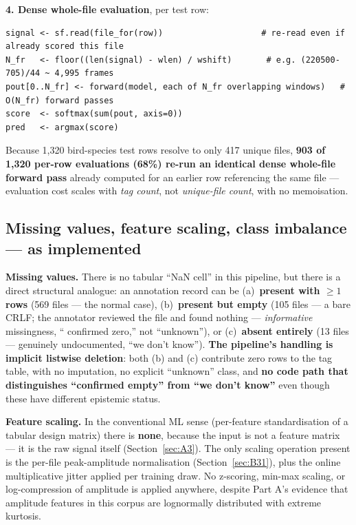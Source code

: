 \documentclass[11pt]{article}
\begin{document}
\textbf{4. Dense whole-file evaluation}, per test row:
\begin{lstlisting}
signal <- sf.read(file_for(row))                    # re-read even if already scored this file
N_fr   <- floor((len(signal) - wlen) / wshift)       # e.g. (220500-705)/44 ~ 4,995 frames
pout[0..N_fr] <- forward(model, each of N_fr overlapping windows)   # O(N_fr) forward passes
score  <- softmax(sum(pout, axis=0))
pred   <- argmax(score)
\end{lstlisting}
Because 1,320 bird-species test rows resolve to only 417 unique files,
\textbf{903 of 1,320 per-row evaluations (68\%) re-run an identical dense
whole-file forward pass} already computed for an earlier row referencing the
same file --- evaluation cost scales with \emph{tag count}, not
\emph{unique-file count}, with no memoisation.

\subsection{Missing values, feature scaling, class imbalance --- as implemented}
\label{sec:C3}

\textbf{Missing values.} There is no tabular ``NaN cell'' in this pipeline,
but there is a direct structural analogue: an annotation record can be
(a)~\textbf{present with $\geq 1$ rows} (569 files --- the normal case),
(b)~\textbf{present but empty} (105 files --- a bare CRLF; the annotator
reviewed the file and found nothing --- \emph{informative} missingness, ``
confirmed zero,'' not ``unknown''), or (c)~\textbf{absent entirely} (13
files --- genuinely undocumented, ``we don't know''). \textbf{The
pipeline's handling is implicit listwise deletion}: both (b) and (c)
contribute zero rows to the tag table, with no imputation, no explicit
``unknown'' class, and \textbf{no code path that distinguishes ``confirmed
empty'' from ``we don't know''} even though these have different epistemic
status.

\textbf{Feature scaling.} In the conventional ML sense (per-feature
standardisation of a tabular design matrix) there is \textbf{none}, because
the input is not a feature matrix --- it is the raw signal itself
(Section~\ref{sec:A3}). The only scaling operation present is the per-file
peak-amplitude normalisation (Section~\ref{sec:B31}), plus the online
multiplicative jitter applied per training draw. No z-scoring, min-max
scaling, or log-compression of amplitude is applied anywhere, despite
Part A's evidence that amplitude features in this corpus are lognormally
distributed with extreme kurtosis.
\end{document}

